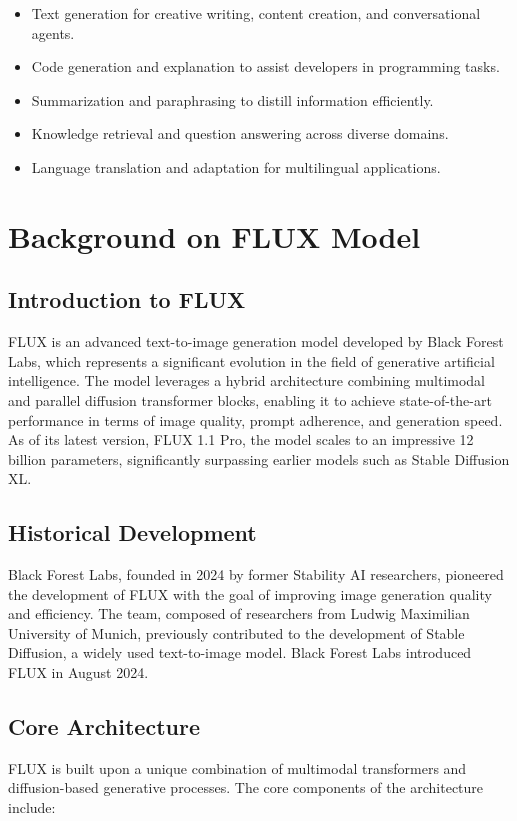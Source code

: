 \begin{itemize}
    \item Text generation for creative writing, content creation, and conversational agents.
    \item Code generation and explanation to assist developers in programming tasks.
    \item Summarization and paraphrasing to distill information efficiently.
    \item Knowledge retrieval and question answering across diverse domains.
    \item Language translation and adaptation for multilingual applications.
\end{itemize}




\section{Background on FLUX Model}

\subsection{Introduction to FLUX}
FLUX is an advanced text-to-image generation model developed by Black Forest Labs, which represents a significant evolution in the field of generative artificial intelligence. The model leverages a hybrid architecture combining multimodal and parallel diffusion transformer blocks, enabling it to achieve state-of-the-art performance in terms of image quality, prompt adherence, and generation speed. As of its latest version, FLUX 1.1 Pro, the model scales to an impressive 12 billion parameters, significantly surpassing earlier models such as Stable Diffusion XL.

\subsection{Historical Development}
Black Forest Labs, founded in 2024 by former Stability AI researchers, pioneered the development of FLUX with the goal of improving image generation quality and efficiency. The team, composed of researchers from Ludwig Maximilian University of Munich, previously contributed to the development of Stable Diffusion, a widely used text-to-image model. Black Forest Labs introduced FLUX in August 2024.

\subsection{Core Architecture}
FLUX is built upon a unique combination of multimodal transformers and diffusion-based generative processes. The core components of the architecture include:

